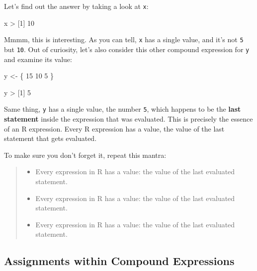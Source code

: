 \documentclass[
]{book}
\newenvironment{Shaded}{\begin{snugshade}}{\end{snugshade}}
\newcommand{\DecValTok}[1]{\textcolor[rgb]{0.00,0.00,0.81}{#1}}
\newcommand{\NormalTok}[1]{#1}
\newcommand{\OtherTok}[1]{\textcolor[rgb]{0.56,0.35,0.01}{#1}}
\newcommand{\SpecialCharTok}[1]{\textcolor[rgb]{0.00,0.00,0.00}{#1}}
\begin{document}
Let's find out the answer by taking a look at \texttt{x}:

\begin{Shaded}
\begin{Highlighting}[]
\NormalTok{x}
\SpecialCharTok{\textgreater{}}\NormalTok{ [}\DecValTok{1}\NormalTok{] }\DecValTok{10}
\end{Highlighting}
\end{Shaded}

Mmmm, this is interesting. As you can tell, \texttt{x} has a single value, and it's
not \texttt{5} but \texttt{10}. Out of curiosity, let's also consider this other compound
expression for \texttt{y} and examine its value:

\begin{Shaded}
\begin{Highlighting}[]
\NormalTok{y }\OtherTok{\textless{}{-}}\NormalTok{ \{}
  \DecValTok{15}
  \DecValTok{10}
  \DecValTok{5}
\NormalTok{\}}

\NormalTok{y}
\SpecialCharTok{\textgreater{}}\NormalTok{ [}\DecValTok{1}\NormalTok{] }\DecValTok{5}
\end{Highlighting}
\end{Shaded}

Same thing, \texttt{y} has a single value, the number \texttt{5}, which happens to be the
\textbf{last statement} inside the expression that was evaluated. This is precisely
the essence of an R expression. Every R expression has a value, the value of
the last statement that gets evaluated.

To make sure you don't forget it, repeat this mantra:

\begin{quote}
\begin{itemize}
\item
  Every expression in R has a value: the value of the last evaluated statement.
\item
  Every expression in R has a value: the value of the last evaluated statement.
\item
  Every expression in R has a value: the value of the last evaluated statement.
\end{itemize}
\end{quote}

\hypertarget{assignments-within-compound-expressions}{%
\subsection{Assignments within Compound Expressions}\label{assignments-within-compound-expressions}}
\end{document}
